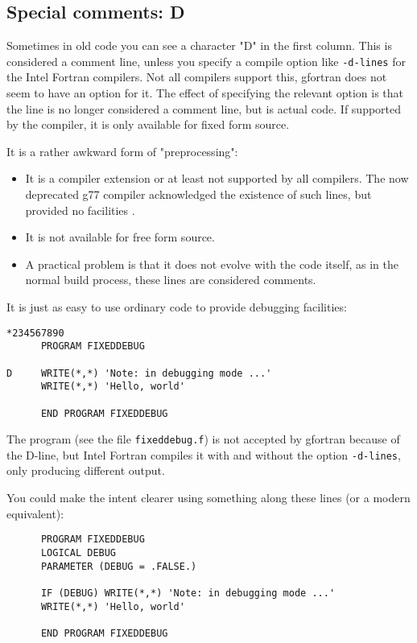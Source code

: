 \subsection{Special comments: D}
Sometimes in old code you can see a character "D" in the first column. This is considered a comment line,
unless you specify a compile option like \verb+-d-lines+ for the Intel Fortran compilers. Not all compilers
support this, gfortran does not seem to have an option for it. The effect of specifying the relevant
option is that the line is no longer considered a comment line, but is actual code. If supported by the compiler,
it is only available for fixed form source.

It is a rather awkward form of "preprocessing":
\begin{itemize}
\item
It is a compiler extension or at least not supported by all compilers. The now deprecated g77 compiler acknowledged
the existence of such lines, but provided no facilities \cite{F77DLine}.
\item
It is not available for free form source.
\item
A practical problem is that it does not evolve with the code itself, as in the normal build process, these
lines are considered comments.
\end{itemize}

It is just as easy to use ordinary code to provide debugging facilities:
\begin{verbatim}
*234567890
      PROGRAM FIXEDDEBUG

D     WRITE(*,*) 'Note: in debugging mode ...'
      WRITE(*,*) 'Hello, world'

      END PROGRAM FIXEDDEBUG
\end{verbatim}

The program (see the file \verb+fixeddebug.f+) is not accepted by gfortran because of the D-line, but Intel Fortran
compiles it with and without the option \verb+-d-lines+, only producing different output.

You could make the intent clearer using something along these lines (or a modern equivalent):
\begin{verbatim}
      PROGRAM FIXEDDEBUG
      LOGICAL DEBUG
      PARAMETER (DEBUG = .FALSE.)

      IF (DEBUG) WRITE(*,*) 'Note: in debugging mode ...'
      WRITE(*,*) 'Hello, world'

      END PROGRAM FIXEDDEBUG
\end{verbatim}

